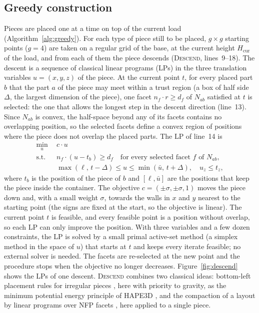 \documentclass[preprint,12pt,authoryear]{elsarticle}
\begin{document}
\subsection{Greedy construction}\label{sec:greedy}
Pieces are placed one at a time on top of the current load (Algorithm~\ref{alg:greedy}). For each type of piece
still to be placed, $g\times g$ starting points ($g=4$) are taken on a regular grid of the base, at the current
height $H_{\text{cur}}$ of the load, and from each of them the piece descends (\textsc{Descend}, lines~9--18).
The descent is a sequence of classical linear programs (LPs) in the three translation variables $u=(x,y,z)$ of the
piece. At the current point $t$, for every placed part $b$ that the part $a$ of the piece may meet within a trust
region (a box of half side $\Delta$, the largest dimension of the piece), one facet $n_f\cdot r\ge d_f$ of $N_{ab}$
satisfied at $t$ is selected: the one that allows the longest step in the descent direction (line~13). Since
$N_{ab}$ is convex, the half-space beyond any of its facets contains no overlapping position, so the selected
facets define a convex region of positions where the piece does not overlap the placed parts. The LP of line~14
is
\begin{equation}\label{eq:descendlp}
\begin{aligned}
\min_{u}\ \ & c\cdot u\\
\text{s.t.}\ \ & n_f\cdot(u-t_b)\ge d_f\quad\text{for every selected facet $f$ of $N_{ab}$},\\
& \max(\ell,\,t-\Delta)\le u\le\min(\bar u,\,t+\Delta),\quad u_z\le t_z,
\end{aligned}
\end{equation}
where $t_b$ is the position of the piece of $b$ and $[\ell,\bar u]$ are the positions that keep the piece inside the
container. The objective $c=(\pm\sigma,\pm\sigma,1)$ moves the piece down and, with a small weight $\sigma$, towards
the walls in $x$ and $y$ nearest to the starting point (the signs are fixed at the start, so the objective is linear).
The current point $t$ is feasible, and every feasible point is a position without overlap, so each LP can only
improve the position. With three variables and a few dozen constraints, the LP is solved by a small primal
active-set method (a simplex method in the space of $u$) that starts at $t$ and keeps every iterate feasible; no
external solver is needed. The facets are re-selected at the new point and the procedure stops when the
objective no longer decreases. Figure~\ref{fig:descend} shows the LPs of one descent. \textsc{Descend}
combines two classical ideas: bottom-left placement rules for irregular pieces \citep{jakobs1996}, here with
priority to gravity, as the minimum potential energy principle of HAPE3D \citep{liu2015}, and the compaction of a
layout by linear programs over NFP facets \citep{li1995,gomes2006}, here applied to a single piece.
\end{document}
